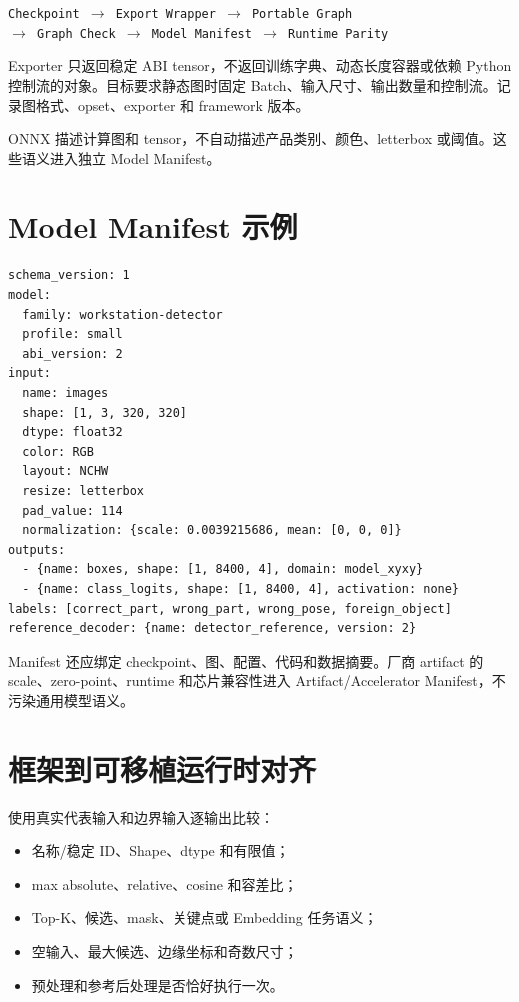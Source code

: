 \begin{center}
\texttt{Checkpoint $\rightarrow$ Export Wrapper $\rightarrow$ Portable Graph}
\\
\texttt{$\rightarrow$ Graph Check $\rightarrow$ Model Manifest $\rightarrow$ Runtime Parity}
\end{center}

Exporter 只返回稳定 ABI tensor，不返回训练字典、动态长度容器或依赖 Python 控制流的对象。目标要求静态图时固定 Batch、输入尺寸、输出数量和控制流。记录图格式、opset、exporter 和 framework 版本。

ONNX 描述计算图和 tensor，不自动描述产品类别、颜色、letterbox 或阈值\cite{onnx-ir}。这些语义进入独立 Model Manifest。

\section{Model Manifest 示例}

\begin{lstlisting}[caption={简化的可移植模型 Manifest}]
schema_version: 1
model:
  family: workstation-detector
  profile: small
  abi_version: 2
input:
  name: images
  shape: [1, 3, 320, 320]
  dtype: float32
  color: RGB
  layout: NCHW
  resize: letterbox
  pad_value: 114
  normalization: {scale: 0.0039215686, mean: [0, 0, 0]}
outputs:
  - {name: boxes, shape: [1, 8400, 4], domain: model_xyxy}
  - {name: class_logits, shape: [1, 8400, 4], activation: none}
labels: [correct_part, wrong_part, wrong_pose, foreign_object]
reference_decoder: {name: detector_reference, version: 2}
\end{lstlisting}

Manifest 还应绑定 checkpoint、图、配置、代码和数据摘要。厂商 artifact 的 scale、zero-point、runtime 和芯片兼容性进入 Artifact/Accelerator Manifest，不污染通用模型语义。

\section{框架到可移植运行时对齐}

使用真实代表输入和边界输入逐输出比较：

\begin{itemize}
  \item 名称/稳定 ID、Shape、dtype 和有限值；
  \item max absolute、relative、cosine 和容差比；
  \item Top-K、候选、mask、关键点或 Embedding 任务语义；
  \item 空输入、最大候选、边缘坐标和奇数尺寸；
  \item 预处理和参考后处理是否恰好执行一次。
\end{itemize}


